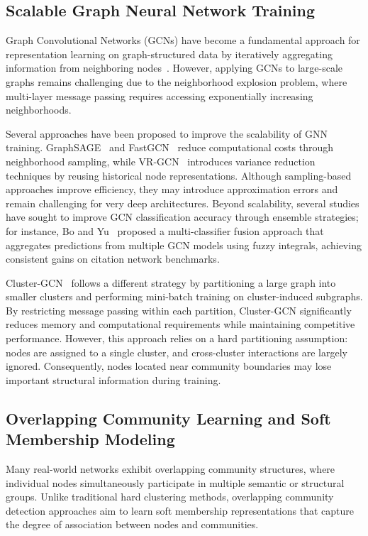 \documentclass[pdflatex,sn-mathphys-num]{sn-jnl}%
\theoremstyle{thmstyleone}%
\theoremstyle{thmstyletwo}%
\theoremstyle{thmstylethree}%
\begin{document}
\subsection{Scalable Graph Neural Network Training}
\label{subsec:scalable-gnn}
Graph Convolutional Networks (GCNs) have become a fundamental approach for representation learning on graph-structured data by iteratively aggregating information from neighboring nodes~\citep{kipf2017semi}.
However, applying GCNs to large-scale graphs remains challenging due to the neighborhood explosion problem, where multi-layer message passing requires accessing exponentially increasing neighborhoods.

Several approaches have been proposed to improve the scalability of GNN training.
GraphSAGE~\citep{GraphSAGE} and FastGCN~\citep{chen2018fastgcn} reduce computational costs through neighborhood sampling, while VR-GCN~\citep{dai2018learning} introduces variance reduction techniques by reusing historical node representations.
Although sampling-based approaches improve efficiency, they may introduce approximation errors and remain challenging for very deep architectures. 
Beyond scalability, several studies have sought to improve GCN classification accuracy through ensemble strategies; for instance, Bo and Yu~\citep{Bo2025} proposed a multi-classifier fusion approach that aggregates predictions from multiple GCN models using fuzzy integrals, achieving consistent gains on citation network benchmarks.

Cluster-GCN~\citep{Cluster-GCN} follows a different strategy by partitioning a large graph into smaller clusters and performing mini-batch training on cluster-induced subgraphs.
By restricting message passing within each partition, Cluster-GCN significantly reduces memory and computational requirements while maintaining competitive performance.
However, this approach relies on a hard partitioning assumption: nodes are assigned to a single cluster, and cross-cluster interactions are largely ignored.
Consequently, nodes located near community boundaries may lose important structural information during training.

\subsection{Overlapping Community Learning and Soft Membership Modeling}
\label{subsec:overlap-community}

Many real-world networks exhibit overlapping community structures, where individual nodes simultaneously participate in multiple semantic or structural groups.
Unlike traditional hard clustering methods, overlapping community detection approaches aim to learn soft membership representations that capture the degree of association between nodes and communities.
\end{document}

